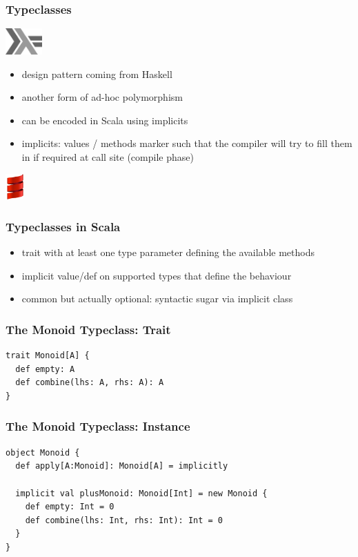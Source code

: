 \documentclass{beamer}
\begin{document}
\begin{frame}
  \frametitle{Typeclasses}
  \includegraphics[height=10mm]{pics/haskell.png}
  \vspace{3mm}
  \begin{itemize}
  \item design pattern coming from Haskell
  \item another form of ad-hoc polymorphism
  \item can be encoded in Scala using implicits
  \item implicits: values / methods marker such that the compiler will
    try to fill them in if required at call site (compile phase)
  \end{itemize}
  \begin{center}
    \hfill{}
    \includegraphics[height=10mm]{pics/smooth-spiral.png}
  \end{center}
\end{frame}

\begin{frame}[fragile]
  \frametitle{Typeclasses in Scala}
  \begin{itemize}
  \item trait with at least one type parameter defining the available
    methods
  \item implicit value/def on supported types that define the
    behaviour
  \item common but actually optional: syntactic sugar via implicit class
  \end{itemize}
\end{frame}

\begin{frame}[fragile]
  \frametitle{The Monoid Typeclass: Trait}
\begin{verbatim}
trait Monoid[A] {
  def empty: A
  def combine(lhs: A, rhs: A): A
}
\end{verbatim}
\end{frame}

\begin{frame}[fragile]
  \frametitle{The Monoid Typeclass: Instance}
\begin{verbatim}
object Monoid {
  def apply[A:Monoid]: Monoid[A] = implicitly

  implicit val plusMonoid: Monoid[Int] = new Monoid {
    def empty: Int = 0
    def combine(lhs: Int, rhs: Int): Int = 0
  }
}
\end{verbatim}
\end{frame}
\end{document}
